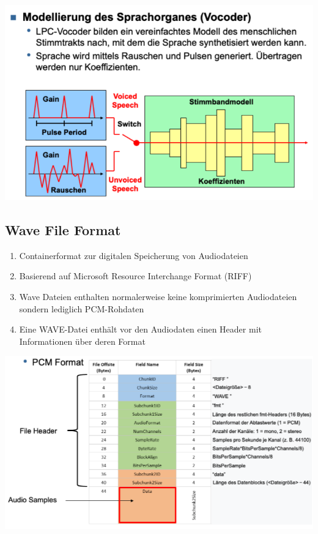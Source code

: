 \begin{center}
    \includegraphics[width=1\linewidth]{images/lpc.png}
\end{center}

\subsection{Wave File Format}%
\label{sub:wave_file_format}

\begin{enumerate}
    \item Containerformat zur digitalen Speicherung von Audiodateien
    \item Basierend auf Microsoft Resource Interchange Format (RIFF)
    \item Wave Dateien enthalten normalerweise keine komprimierten Audiodateien sondern lediglich PCM-Rohdaten
    \item Eine WAVE-Datei enthält vor den Audiodaten einen Header mit Informationen über deren Format
\end{enumerate}

\begin{center}
    \includegraphics[width=1\linewidth]{images/wave.png}
\end{center}

